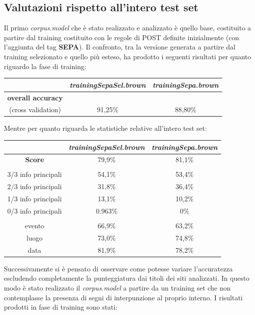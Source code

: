 \documentclass[a4paper]{report}
\begin{document}
\subsection{Valutazioni rispetto all'intero test set}
Il primo \textit{corpus.model} che è stato realizzato e analizzato è quello base, costituito a partire dal training costituito con le regole di POST definite inizialmente (con l'aggiunta del tag \textbf{SEPA}). Il confronto, tra la versione generata a partire dal training selezionato e quello più esteso, ha prodotto i seguenti risultati per quanto riguardo la fase di training:
\begin{center}
\begin{tabular}{c c c}
\hline
 & \textit{trainingSepaSel.brown} & \textit{trainingSepa.brown}\\
\hline
\textbf{overall accuracy} \\ (cross validation) & 91,25\% & 88,80\% \\
\hline
\end{tabular}
\end{center}
Mentre per quanto riguarda le statistiche relative all'intero test set:
\begin{center}
\begin{tabular}{|ccc|}
\hline
 & \textit{trainingSepaSel.brown} & \textit{trainingSepa.brown}\\
\hline
\textbf{Score} & 79,9\% & 81,1\% \\
\hline
 & &  \\
\hline
3/3 info principali & 54,1\% & 53,4\% \\
2/3 info principali & 31,8\% & 36,4\% \\
1/3 info principali & 13,1\% & 10,2\% \\
0/3 info principali & 0.963\% & 0\% \\
\hline
 & &  \\
\hline
evento & 66,9\% & 63,2\% \\
luogo & 73,0\% & 74,8\% \\
data & 81,9\% & 78,2\% \\
\hline
\end{tabular}
\end{center}
Successivamente si è pensato di osservare come potesse variare l'accuratezza escludendo completamente la punteggiatura dai titoli dei siti analizzati. In questo modo è stato realizzato il \textit{corpus.model} a partire da un training set che non contemplasse la presenza di segni di interpunzione al proprio interno. I risultati prodotti in fase di training sono stati:
\end{document}
